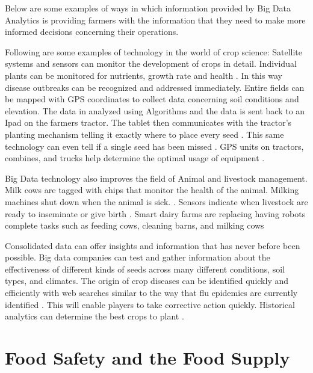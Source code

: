 \documentclass[sigconf]{acmart}
\begin{document}
Below are some examples of ways in which information provided by Big Data Analytics is providing farmers with the information that they need to make more informed decisions concerning their operations.

Following are some examples of technology in the world of crop science: Satellite systems and sensors can monitor the development of crops in detail. Individual plants can be monitored for nutrients, growth rate and health \cite{www-google-bigdatatech}. In this way disease outbreaks can be recognized and addressed immediately.  Entire fields can be mapped with GPS coordinates to collect data concerning soil conditions and elevation. The data in analyzed using Algorithms and the data is sent back to an Ipad on the farmers tractor. The tablet then communicates with the tractor's planting mechanism telling it exactly where to place every seed \cite{www-google-Crop}. This same technology can even tell if a single seed has been missed \cite{www-google-Farm}. GPS units on tractors, combines, and trucks help determine the optimal usage of equipment \cite{www-google-bigdatatech}.

Big Data technology also improves the field of Animal and livestock management. Milk cows are tagged with chips that monitor the health of the animal. Milking machines shut down when the animal is sick. \cite{DevEcon}.  Sensors indicate when livestock are ready to inseminate or give birth \cite{www-google-Digital}. Smart dairy farms are replacing having robots complete tasks such as feeding cows, cleaning barns, and milking cows \cite{Wolfert} 

Consolidated data can offer insights and information that has never before been possible. Big data companies can test and gather information about the effectiveness of different kinds of seeds across many different conditions, soil types, and climates. The origin of crop diseases can be identified quickly and efficiently with web searches similar to the way that flu epidemics are currently identified \cite{www-google-Farm}. This will enable players to take corrective action quickly. Historical analytics can determine the best crops to plant \cite{Wolfert}. 


\section{Food Safety and the Food Supply}
\end{document}
